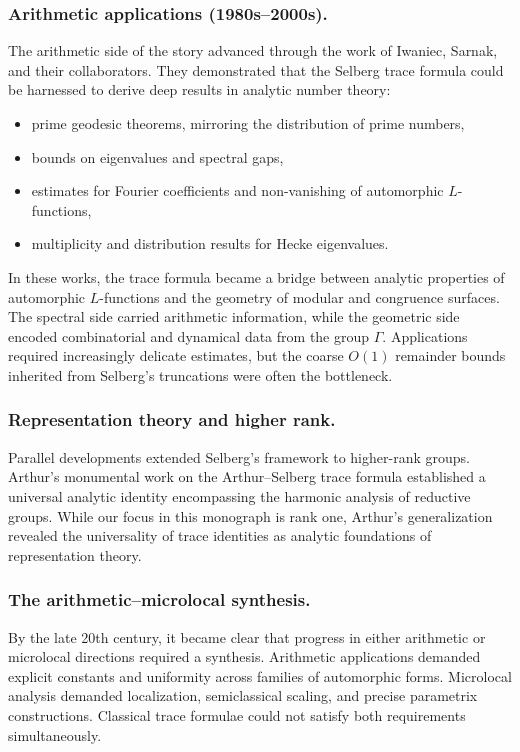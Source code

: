 \subsubsection*{Arithmetic applications (1980s–2000s).}
The arithmetic side of the story advanced through the work of Iwaniec, Sarnak,
and their collaborators. They demonstrated that the Selberg trace formula could
be harnessed to derive deep results in analytic number theory:
\begin{itemize}
  \item prime geodesic theorems, mirroring the distribution of prime numbers,
  \item bounds on eigenvalues and spectral gaps,
  \item estimates for Fourier coefficients and non-vanishing of automorphic $L$-functions,
  \item multiplicity and distribution results for Hecke eigenvalues.
\end{itemize}

In these works, the trace formula became a bridge between analytic properties
of automorphic $L$-functions and the geometry of modular and congruence
surfaces. The spectral side carried arithmetic information, while the geometric
side encoded combinatorial and dynamical data from the group $\Gamma$.
Applications required increasingly delicate estimates, but the coarse $O(1)$
remainder bounds inherited from Selberg’s truncations were often the bottleneck.

\subsubsection*{Representation theory and higher rank.}
Parallel developments extended Selberg’s framework to higher-rank groups.
Arthur’s monumental work on the Arthur–Selberg trace formula \cite{ArthurBook}
established a universal analytic identity encompassing the harmonic analysis of
reductive groups. While our focus in this monograph is rank one, Arthur’s
generalization revealed the universality of trace identities as analytic
foundations of representation theory.

\subsubsection*{The arithmetic–microlocal synthesis.}
By the late 20th century, it became clear that progress in either arithmetic or
microlocal directions required a synthesis. Arithmetic applications demanded
explicit constants and uniformity across families of automorphic forms.
Microlocal analysis demanded localization, semiclassical scaling, and precise
parametrix constructions. Classical trace formulae could not satisfy both
requirements simultaneously.

